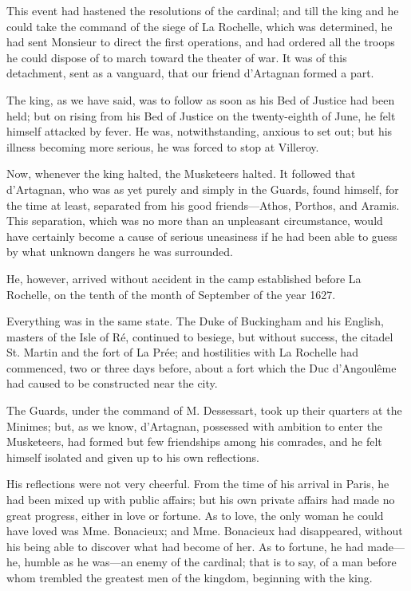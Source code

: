 This event had hastened the resolutions of the cardinal; and till the king and he could take the command of the siege of La Rochelle, which was determined, he had sent Monsieur to direct the first operations, and had ordered all the troops he could dispose of to march toward the theater of war. It was of this detachment, sent as a vanguard, that our friend d'Artagnan formed a part. 

The king, as we have said, was to follow as soon as his Bed of Justice had been held; but on rising from his Bed of Justice on the twenty-eighth of June, he felt himself attacked by fever. He was, notwithstanding, anxious to set out; but his illness becoming more serious, he was forced to stop at Villeroy. 

Now, whenever the king halted, the Musketeers halted. It followed that d'Artagnan, who was as yet purely and simply in the Guards, found himself, for the time at least, separated from his good friends---Athos, Porthos, and Aramis. This separation, which was no more than an unpleasant circumstance, would have certainly become a cause of serious uneasiness if he had been able to guess by what unknown dangers he was surrounded. 

He, however, arrived without accident in the camp established before La Rochelle, on the tenth of the month of September of the year 1627. 

Everything was in the same state. The Duke of Buckingham and his English, masters of the Isle of Ré, continued to besiege, but without success, the citadel St. Martin and the fort of La Prée; and hostilities with La Rochelle had commenced, two or three days before, about a fort which the Duc d'Angoulême had caused to be constructed near the city. 

The Guards, under the command of M. Dessessart, took up their quarters at the Minimes; but, as we know, d'Artagnan, possessed with ambition to enter the Musketeers, had formed but few friendships among his comrades, and he felt himself isolated and given up to his own reflections. 

His reflections were not very cheerful. From the time of his arrival in Paris, he had been mixed up with public affairs; but his own private affairs had made no great progress, either in love or fortune. As to love, the only woman he could have loved was Mme. Bonacieux; and Mme. Bonacieux had disappeared, without his being able to discover what had become of her. As to fortune, he had made---he, humble as he was---an enemy of the cardinal; that is to say, of a man before whom trembled the greatest men of the kingdom, beginning with the king. 

